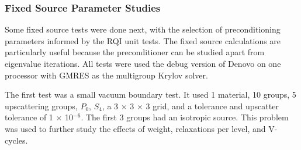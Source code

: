 \subsubsection{Fixed Source Parameter Studies}
Some fixed source tests were done next, with the selection of preconditioning parameters informed by the RQI unit tests. The fixed source calculations are particularly useful because the preconditioner can be studied apart from eigenvalue iterations. All tests were used the debug version of Denovo on one processor with GMRES as the multigroup Krylov solver.

The first test was a small vacuum boundary test. It used 1 material, 10 groups, 5 upscattering groups, $P_{0}$, $S_{4}$, a 3 $\times$ 3 $\times$ 3 grid, and a tolerance and upscatter tolerance of 1 $\times$ 10$^{-6}$. The first 3 groups had an isotropic source. This problem was used to further study the effects of weight, relaxations per level, and V-cycles.

